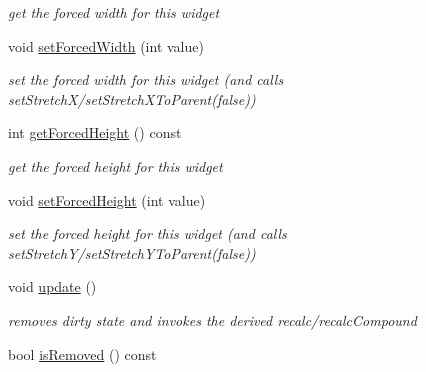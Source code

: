 \begin{DoxyCompactItemize}
\begin{DoxyCompactList}\small\item\em get the forced width for this widget \end{DoxyCompactList}\item 
void \hyperlink{classcanvascv_1_1Widget_a2dec191f9e2be6a1a291e6da275adca5}{set\+Forced\+Width} (int value)\hypertarget{classcanvascv_1_1Widget_a2dec191f9e2be6a1a291e6da275adca5}{}\label{classcanvascv_1_1Widget_a2dec191f9e2be6a1a291e6da275adca5}

\begin{DoxyCompactList}\small\item\em set the forced width for this widget (and calls set\+Stretch\+X/set\+Stretch\+X\+To\+Parent(false)) \end{DoxyCompactList}\item 
int \hyperlink{classcanvascv_1_1Widget_afd30c281d961fa92498f1eea83c22e6a}{get\+Forced\+Height} () const \hypertarget{classcanvascv_1_1Widget_afd30c281d961fa92498f1eea83c22e6a}{}\label{classcanvascv_1_1Widget_afd30c281d961fa92498f1eea83c22e6a}

\begin{DoxyCompactList}\small\item\em get the forced height for this widget \end{DoxyCompactList}\item 
void \hyperlink{classcanvascv_1_1Widget_aa88e20a2d34e335b134213cccfdef529}{set\+Forced\+Height} (int value)\hypertarget{classcanvascv_1_1Widget_aa88e20a2d34e335b134213cccfdef529}{}\label{classcanvascv_1_1Widget_aa88e20a2d34e335b134213cccfdef529}

\begin{DoxyCompactList}\small\item\em set the forced height for this widget (and calls set\+Stretch\+Y/set\+Stretch\+Y\+To\+Parent(false)) \end{DoxyCompactList}\item 
void \hyperlink{classcanvascv_1_1Widget_a5cfbbfb73055a55d679c7519926793bc}{update} ()\hypertarget{classcanvascv_1_1Widget_a5cfbbfb73055a55d679c7519926793bc}{}\label{classcanvascv_1_1Widget_a5cfbbfb73055a55d679c7519926793bc}

\begin{DoxyCompactList}\small\item\em removes \textquotesingle{}dirty\textquotesingle{} state and invokes the derived \textquotesingle{}recalc/recalc\+Compound\textquotesingle{} \end{DoxyCompactList}\item 
bool \hyperlink{classcanvascv_1_1Widget_ae7ba2e02a399317607a2a5dcd3b4a800}{is\+Removed} () const \hypertarget{classcanvascv_1_1Widget_ae7ba2e02a399317607a2a5dcd3b4a800}{}\label{classcanvascv_1_1Widget_ae7ba2e02a399317607a2a5dcd3b4a800}


\end{DoxyCompactItemize}
